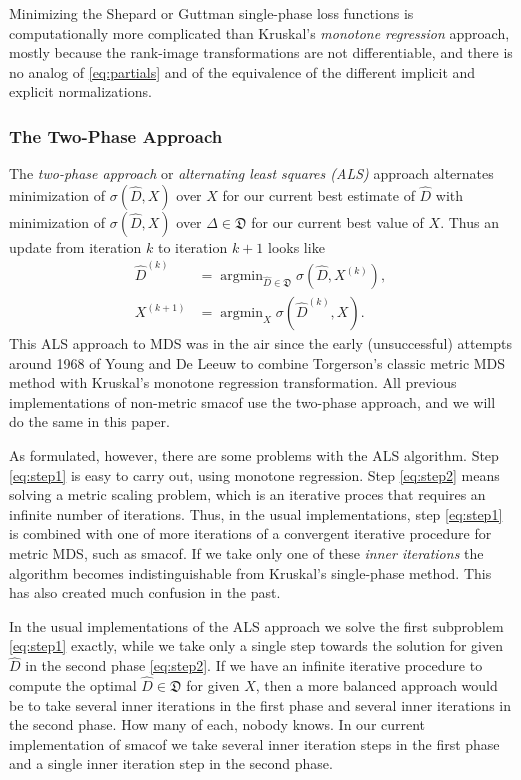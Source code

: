 \documentclass[
  12pt,
]{article}
\begin{document}
Minimizing the Shepard or Guttman single-phase loss functions is
computationally more complicated than Kruskal's \emph{monotone regression}
approach, mostly because the rank-image transformations are not
differentiable, and there is no analog of \eqref{eq:partials} and of the
equivalence of the different implicit and explicit normalizations.

\subsubsection{The Two-Phase Approach}\label{the-two-phase-approach}

The \emph{two-phase approach} or \emph{alternating least squares (ALS)} approach
alternates minimization of \(\sigma(\hat D,X)\) over \(X\) for our current
best estimate of \(\hat D\) with minimization of \(\sigma(\hat D,X)\) over
\(\Delta\in\mathfrak{D}\) for our current best value of \(X\). Thus an
update from iteration \(k\) to iteration \(k+1\) looks like
\begin{subequations}
\begin{align}
\hat D^{(k)}&=\mathop{\text{argmin}}_{\hat D\in\mathfrak{D}}\sigma(\hat D,X^{(k)}),\label{eq:step1}\\
X^{(k+1)}&=\mathop{\text{argmin}}_X\sigma(\hat D^{(k)},X).\label{eq:step2}
\end{align} 
\end{subequations}
This ALS approach to MDS was in the air since the early
(unsuccessful) attempts around 1968 of Young and De Leeuw to combine
Torgerson's classic metric MDS method with Kruskal's monotone regression
transformation. All previous implementations of non-metric smacof use
the two-phase approach, and we will do the same in this paper.

As formulated, however, there are some problems with the ALS algorithm.
Step \eqref{eq:step1} is easy to carry out, using monotone regression.
Step \eqref{eq:step2} means solving a metric scaling problem, which is an
iterative proces that requires an infinite number of iterations. Thus,
in the usual implementations, step \eqref{eq:step1} is combined with one
of more iterations of a convergent iterative procedure for metric MDS,
such as smacof. If we take only one of these \emph{inner iterations} the
algorithm becomes indistinguishable from Kruskal's single-phase method.
This has also created much confusion in the past.

In the usual implementations of the ALS approach we solve the first
subproblem \eqref{eq:step1} exactly, while we take only a single step
towards the solution for given \(\hat D\) in the second phase
\eqref{eq:step2}. If we have an infinite iterative procedure to compute
the optimal \(\hat D\in\mathfrak{D}\) for given \(X\), then a more balanced
approach would be to take several inner iterations in the first phase
and several inner iterations in the second phase. How many of each,
nobody knows. In our current implementation of smacof we take several
inner iteration steps in the first phase and a single inner iteration
step in the second phase.
\end{document}
